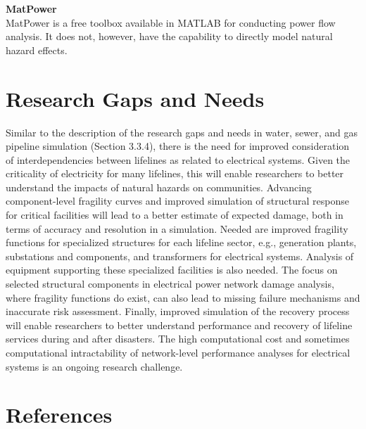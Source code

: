 \noindent\textbf{MatPower} \\MatPower is a free toolbox available in MATLAB for conducting power flow analysis. It does not, however, have the capability to directly model natural hazard effects.

\section{Research Gaps and Needs}
\label{sec:perf_power_gaps}

Similar to the description of the research gaps and needs in water, sewer, and gas pipeline simulation (Section 3.3.4), there is the need for improved consideration of interdependencies between lifelines as related to electrical systems. Given the criticality of electricity for many lifelines, this will enable researchers to better understand the impacts of natural hazards on communities. Advancing component-level fragility curves and improved simulation of structural response for critical facilities will lead to a better estimate of expected damage, both in terms of accuracy and resolution in a simulation. Needed are improved fragility functions for specialized structures for each lifeline sector, e.g., generation plants, substations and components, and transformers for electrical systems. Analysis of equipment supporting these specialized facilities is also needed. The focus on selected structural components in electrical power network damage analysis, where fragility functions do exist, can also lead to missing failure mechanisms and inaccurate risk assessment. Finally, improved simulation of the recovery process will enable researchers to better understand performance and recovery of lifeline services during and after disasters. The high computational cost and sometimes computational intractability of network-level performance analyses for electrical systems is an ongoing research challenge.

\section{References}




